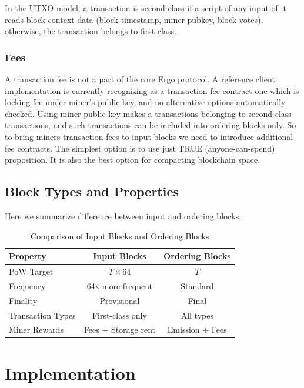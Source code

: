 \documentclass{llncs}
\begin{document}
In the UTXO model, a transaction is second-class if a script of any input of it reads block context data
(block timestamp, miner pubkey, block votes), otherwise, the transaction belongs to first class.

\subsubsection{Fees}
\label{subsubsec:fees}

A transaction fee is not a part of the core Ergo protocol. A reference client implementation is currently recognizing
as a transaction fee contract one which is locking fee under miner's public key, and no alternative options
automatically checked. Using miner public key makes a transactions belonging to second-class transactions, and such
transactions can be included into ordering blocks only. So to bring miners transaction fees to input blocks we need to introduce additional
fee contracts. The simplest option is to use just TRUE (anyone-can-spend) proposition. It is also the best option for
compacting blockchain space.

\subsection{Block Types and Properties}
\label{subsec:block-types}

Here we summarize difference between input and ordering blocks.

\begin{table}[h]
\centering
\begin{tabular}{lcc}
\hline
\textbf{Property} & \textbf{Input Blocks} & \textbf{Ordering Blocks} \\
\hline
PoW Target & $T \times 64$ & $T$ \\
Frequency & 64x more frequent & Standard \\
Finality & Provisional & Final \\
Transaction Types & First-class only & All types \\
Miner Rewards & Fees + Storage rent & Emission + Fees \\
\hline
\end{tabular}
\caption{Comparison of Input Blocks and Ordering Blocks}
\label{tab:block-comparison}
\end{table}

\section{Implementation}
\label{sec:implementation}
\end{document}
